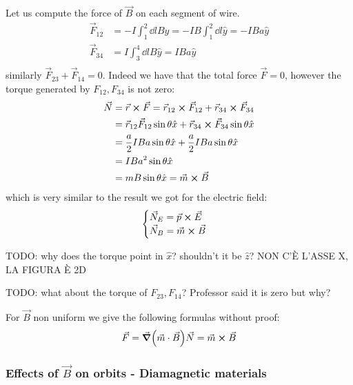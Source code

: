 \documentclass[12pt]{extarticle}
\begin{document}
Let us compute the force of $\vec B$ on each segment of wire.
\begin{align}
    \vec F_{12} & = -I \int_1^2 \dd l B \hat y = -I B \int_1^2 \dd l \hat y = - I B a \hat y \\
    \vec F_{34} & = I \int_3^4 \dd l B \hat y =  I B a \hat y                                \\
\end{align}
similarly $\vec F_{23} + \vec F_{14} = 0$.
Indeed we have that the total force $\vec F = 0$, however the torque generated by $F_{12}, F_{34}$ is not zero:
\begin{align}
    \vec N & = \vec r \cross \vec F = \vec r_{12} \cross \vec F_{12} + \vec r_{34} \cross \vec F_{34}        \\
           & = \vec r_{12} \vec F_{12} \sin \theta \hat x+ \vec r_{34} \cross \vec F_{34} \sin \theta \hat x \\
           & = \frac{a}{2} I B a \sin \theta \hat x + \frac{a}{2} I B a \sin \theta \hat x                   \\
           & = I B a^2 \sin \theta \hat x                                                                    \\
           & = m B \sin \theta \hat x = \vec m \cross \vec B
\end{align}
which is very similar to the result we got for the electric field:
\begin{equation}
    \begin{cases}
        \vec N_E = \vec p \cross \vec E \\
        \vec N_B = \vec m \cross \vec B
    \end{cases}
\end{equation}

TODO: why does the torque point in $\hat x$? shouldn't it be $\hat z$?
NON C'È L'ASSE X, LA FIGURA È 2D

TODO: what about the torque of $F_{23}, F_{14}$? Professor said it is zero but why?

For $\vec B$ non uniform we give the following formulas without proof:
\begin{equation}
    \vec F = \grad(\vec m \cdot \vec B)\\
    \vec N = \vec m \cross \vec B
\end{equation}

\subsubsection{Effects of \texorpdfstring{$\vec B$}{B} on orbits - Diamagnetic materials}
\end{document}
